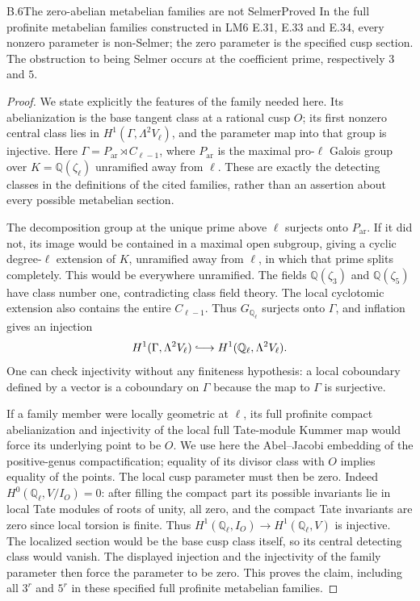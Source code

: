 \begin{statement}{B.6}{The zero-abelian metabelian families are not Selmer}{Proved}
In the full profinite metabelian families constructed in LM6 E.31,
E.33 and E.34, every nonzero parameter is non-Selmer; the zero
parameter is the specified cusp section. The obstruction to being
Selmer occurs at the coefficient prime, respectively $3$ and $5$.
\end{statement}
\begin{proof}
We state explicitly the features of the family needed here. Its
abelianization is the base tangent class at a rational cusp $O$;
its first nonzero central class lies in
$H^1(\Gamma,\Lambda^2 V_\ell)$, and the parameter map into that
group is injective. Here $\Gamma=P_{\mathrm{ar}}\rtimes C_{\ell-1}$,
where $P_{\mathrm{ar}}$ is the maximal pro-$\ell$ Galois group over
$K=\mathbb Q(\zeta_\ell)$ unramified away from $\ell$. These are
exactly the detecting classes in the definitions of the cited
families, rather than an assertion about every possible metabelian
section.

The decomposition group at the unique prime above $\ell$ surjects
onto $P_{\mathrm{ar}}$. If it did not, its image would be contained
in a maximal open subgroup, giving a cyclic degree-$\ell$ extension
of $K$, unramified away from $\ell$, in which that prime splits
completely. This would be everywhere unramified. The fields
$\mathbb Q(\zeta_3)$ and $\mathbb Q(\zeta_5)$ have class number one,
contradicting class field theory. The local cyclotomic extension also
contains the entire $C_{\ell-1}$. Thus $G_{\mathbb Q_\ell}$ surjects
onto $\Gamma$, and inflation gives an injection
\[
 H^1(\Gamma,\Lambda^2 V_\ell)
 \lhook\joinrel\longrightarrow
 H^1(\mathbb Q_\ell,\Lambda^2 V_\ell).
\]
One can check injectivity without any finiteness hypothesis: a
local coboundary defined by a vector is a coboundary on $\Gamma$
because the map to $\Gamma$ is surjective.

If a family member were locally geometric at $\ell$, its full
profinite compact abelianization and injectivity of the local full
Tate-module Kummer map would force its underlying point to be $O$.
We use here the Abel--Jacobi embedding of the positive-genus
compactification; equality of its divisor class with $O$ implies
equality of the points. The local cusp parameter must then be zero.
Indeed $H^0(\mathbb Q_\ell,V/I_O)=0$: after filling the compact
part its possible invariants lie in local Tate modules of roots of
unity, all zero, and the compact Tate invariants are zero since local
torsion is finite. Thus
$H^1(\mathbb Q_\ell,I_O)\to H^1(\mathbb Q_\ell,V)$ is injective.
The localized section would be the base cusp class itself, so its
central detecting class would vanish. The displayed injection and
the injectivity of the family parameter then force the parameter to
be zero. This proves the claim, including all $3^r$ and $5^r$ in
these specified full profinite metabelian families.
\end{proof}

